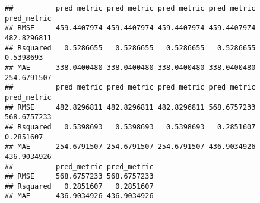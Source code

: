 \documentclass[]{article}
\newenvironment{Shaded}{\begin{snugshade}}{\end{snugshade}}
\newcommand{\KeywordTok}[1]{\textcolor[rgb]{0.13,0.29,0.53}{\textbf{#1}}}
\newcommand{\DataTypeTok}[1]{\textcolor[rgb]{0.13,0.29,0.53}{#1}}
\newcommand{\DecValTok}[1]{\textcolor[rgb]{0.00,0.00,0.81}{#1}}
\newcommand{\StringTok}[1]{\textcolor[rgb]{0.31,0.60,0.02}{#1}}
\newcommand{\ControlFlowTok}[1]{\textcolor[rgb]{0.13,0.29,0.53}{\textbf{#1}}}
\newcommand{\OperatorTok}[1]{\textcolor[rgb]{0.81,0.36,0.00}{\textbf{#1}}}
\newcommand{\NormalTok}[1]{#1}
\begin{document}
\begin{Shaded}
\end{Shaded}

\begin{verbatim}
##          pred_metric pred_metric pred_metric pred_metric pred_metric
## RMSE     459.4407974 459.4407974 459.4407974 459.4407974 482.8296811
## Rsquared   0.5286655   0.5286655   0.5286655   0.5286655   0.5398693
## MAE      338.0400480 338.0400480 338.0400480 338.0400480 254.6791507
##          pred_metric pred_metric pred_metric pred_metric pred_metric
## RMSE     482.8296811 482.8296811 482.8296811 568.6757233 568.6757233
## Rsquared   0.5398693   0.5398693   0.5398693   0.2851607   0.2851607
## MAE      254.6791507 254.6791507 254.6791507 436.9034926 436.9034926
##          pred_metric pred_metric
## RMSE     568.6757233 568.6757233
## Rsquared   0.2851607   0.2851607
## MAE      436.9034926 436.9034926
\end{verbatim}
\end{document}

